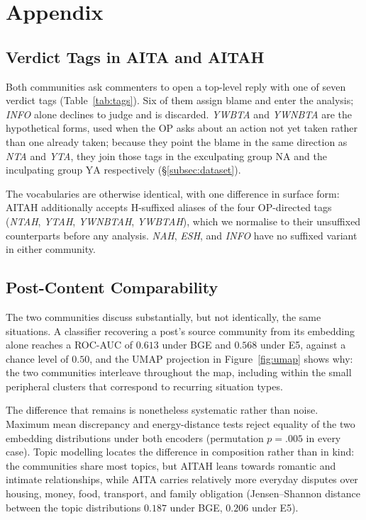 \appendix
\newpage
\section{Appendix}

\subsection{Verdict Tags in AITA and AITAH}
\label{sec:appendix-tags}

Both communities ask commenters to open a top-level reply with one of seven
verdict tags (Table~\ref{tab:tags}). Six of them assign blame and enter the
analysis; \emph{INFO} alone declines to judge and is discarded. \emph{YWBTA}
and \emph{YWNBTA} are the hypothetical forms, used when the OP asks about an
action not yet taken rather than one already taken; because they point the
blame in the same direction as \emph{NTA} and \emph{YTA}, they join those tags
in the exculpating group $\mathrm{NA}$ and the inculpating group $\mathrm{YA}$
respectively (\S\ref{subsec:dataset}).

The vocabularies are otherwise identical, with one difference in surface form:
AITAH additionally accepts H-suffixed aliases of the four OP-directed tags
(\emph{NTAH}, \emph{YTAH}, \emph{YWNBTAH}, \emph{YWBTAH}), which we normalise to
their unsuffixed counterparts before any analysis. \emph{NAH}, \emph{ESH}, and
\emph{INFO} have no suffixed variant in either community.




\subsection{Post-Content Comparability}
\label{sec:appendix-content}

The two communities discuss substantially, but not identically, the same
situations. A classifier recovering a post's source community from its
embedding alone reaches a ROC-AUC of $0.613$ under BGE and $0.568$ under E5,
against a chance level of $0.50$, and the UMAP projection in
Figure~\ref{fig:umap} shows why: the two communities interleave throughout the
map, including within the small peripheral clusters that correspond to
recurring situation types.

The difference that remains is nonetheless systematic rather than noise.
Maximum mean discrepancy and energy-distance tests reject equality of the two
embedding distributions under both encoders (permutation $p=.005$ in every
case). Topic modelling locates the difference in composition rather than in
kind: the communities share most topics, but AITAH leans towards romantic and
intimate relationships, while AITA carries relatively more everyday disputes
over housing, money, food, transport, and family obligation (Jensen--Shannon
distance between the topic distributions $0.187$ under BGE, $0.206$ under E5).

